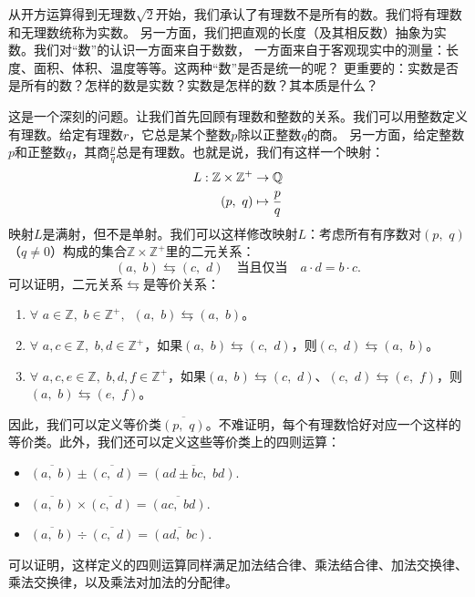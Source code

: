 \documentclass[12pt,UTF8]{ctexbook}
\begin{document}
从开方运算得到无理数$\sqrt{2}$开始，我们承认了有理数不是所有的数。我们将有理数和无理数统称为实数。
另一方面，我们把直观的长度（及其相反数）抽象为实数。我们对“数”的认识一方面来自于数数，
一方面来自于客观现实中的测量：长度、面积、体积、温度等等。这两种“数”是否是统一的呢？
更重要的：实数是否是所有的数？怎样的数是实数？实数是怎样的数？其本质是什么？

这是一个深刻的问题。让我们首先回顾有理数和整数的关系。我们可以用整数定义有理数。给定有理数$r$，它总是某个整数$p$除以正整数$q$的商。
另一方面，给定整数$p$和正整数$q$，其商$\frac{p}{q}$总是有理数。也就是说，我们有这样一个映射：
\begin{align}
    L: \mathbb{Z} \times \mathbb{Z}^+ &\rightarrow \mathbb{Q} \notag \\
    (p, \,\, q) &\mapsto \frac{p}{q} \notag
\end{align}
映射$L$是满射，但不是单射。我们可以这样修改映射$L$：考虑所有有序数对$(p, \,\, q)$（$q\neq 0$）构成的集合$\mathbb{Z} \times \mathbb{Z}^+$里的二元关系：
$$ (a,\,\, b) \leftrightarrows (c, \,\, d)\quad \mbox{当且仅当} \quad a\cdot d = b \cdot c.$$
可以证明，二元关系$\leftrightarrows$是等价关系：
\begin{enumerate}
    \item $\forall \,\, a\in \mathbb{Z}, \,\, b\in\mathbb{Z}^+, \,\,\, (a,\,\, b) \leftrightarrows (a, \,\, b)$。
    \item $\forall \,\, a,c\in \mathbb{Z}, \,\, b,d\in\mathbb{Z}^+$，如果$(a,\,\, b) \leftrightarrows (c, \,\, d)$，则$ (c, \,\, d)\leftrightarrows (a,\,\, b)$。
    \item $\forall \,\, a,c,e\in \mathbb{Z}, \,\, b,d,f\in\mathbb{Z}^+$，如果$(a,\,\, b) \leftrightarrows (c, \,\, d)$、$ (c, \,\, d)\leftrightarrows (e,\,\, f)$，则$(a,\,\, b) \leftrightarrows (e,\,\, f)$。
\end{enumerate}
因此，我们可以定义等价类$\overline{(p,\,\, q)}$。不难证明，每个有理数恰好对应一个这样的等价类。此外，我们还可以定义这些等价类上的四则运算：
\begin{itemize}
    \item $\overline{(a,\,\, b)} \pm \overline{(c, \,\, d)} = \overline{(ad \pm bc, \,\, bd)}.$
    \item $\overline{(a,\,\, b)} \times \overline{(c, \,\, d)} = \overline{(ac, \,\, bd)}.$
    \item $\overline{(a,\,\, b)} \div \overline{(c, \,\, d)} = \overline{(ad, \,\, bc)}.$
\end{itemize}
可以证明，这样定义的四则运算同样满足加法结合律、乘法结合律、加法交换律、乘法交换律，以及乘法对加法的分配律。
\end{document}
